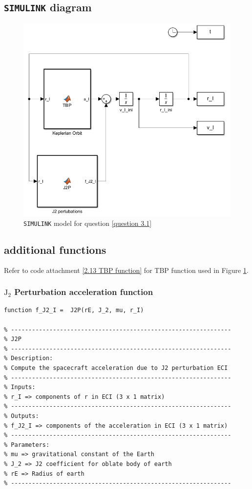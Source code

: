 \documentclass[hidelinks, 12pt]{article}%
\begin{document}
\begin{appendices}
\subsection{\texttt{SIMULINK} diagram}
    \begin{figure}[H]
        \begin{centering}
            \includegraphics[width=\textwidth]{output_files/3.1/model_3.1.png}
            \caption{\texttt{SIMULINK} model for question \ref{question 3.1}}
            \label{3.1 diagram}
        \end{centering}
    \end{figure}
\subsection{additional functions}
Refer to code attachment \ref{2.13 TBP function} for TBP function used in Figure \ref{3.1 diagram}.
\subsubsection{$\text{J}_2$ Perturbation acceleration function}

\begin{verbatim}
function f_J2_I =  J2P(rE, J_2, mu, r_I)

% ---------------------------------------------------------------
% J2P
% ---------------------------------------------------------------
% Description:
% Compute the spacecraft acceleration due to J2 perturbation ECI
% ---------------------------------------------------------------
% Inputs:
% r_I => components of r in ECI (3 x 1 matrix)
% ---------------------------------------------------------------
% Outputs:
% f_J2_I => components of the acceleration in ECI (3 x 1 matrix)
% ---------------------------------------------------------------
% Parameters:
% mu => gravitational constant of the Earth
% J_2 => J2 coefficient for oblate body of earth
% rE => Radius of earth
% ---------------------------------------------------------------


\end{verbatim}
\end{appendices}
\end{document}
